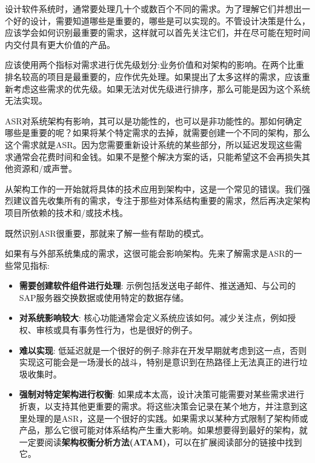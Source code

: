 
设计软件系统时，通常要处理几十个或数百个不同的需求。为了理解它们并想出一个好的设计，需要知道哪些是重要的，哪些是可以实现的。不管设计决策是什么，应该学会如何识别最重要的需求，这样就可以首先关注它们，并在尽可能在短时间内交付具有更大价值的产品。

\begin{tcolorbox}[colback=webgreen!5!white,colframe=webgreen!75!black, title=TIP]
\hspace*{0.7cm}应该使用两个指标对需求进行优先级划分:业务价值和对架构的影响。在两个比重排名较高的项目是最重要的，应作优先处理。如果提出了太多这样的需求，应该重新考虑这些需求的优先级。如果无法对优先级进行排序，那么可能是因为这个系统无法实现。
\end{tcolorbox}

ASR对系统架构有影响，其可以是功能性的，也可以是非功能性的。那如何确定哪些是重要的呢？如果将某个特定需求的去掉，就需要创建一个不同的架构，那么这个需求就是ASR。因为您需要重新设计系统的某些部分，所以延迟发现这些需求通常会花费时间和金钱。如果不是整个解决方案的话，只能希望这不会再损失其他资源和/或声誉。

\begin{tcolorbox}[colback=webgreen!5!white,colframe=webgreen!75!black, title=TIP]
\hspace*{0.7cm}从架构工作的一开始就将具体的技术应用到架构中，这是一个常见的错误。我们强烈建议首先收集所有的需求，专注于那些对体系结构重要的需求，然后再决定架构项目所依赖的技术和/或技术栈。
\end{tcolorbox}

既然识别ASR很重要，那就来了解一些有帮助的模式。


如果有与外部系统集成的需求，这很可能会影响架构。先来了解需求是ASR的一些常见指标:

\begin{itemize}
\item 
\textbf{需要创建软件组件进行处理}: 示例包括发送电子邮件、推送通知、与公司的SAP服务器交换数据或使用特定的数据存储。

\item 
\textbf{对系统影响较大}: 核心功能通常会定义系统应该如何。减少关注点，例如授权、审核或具有事务性行为，也是很好的例子。

\item 
\textbf{难以实现}: 低延迟就是一个很好的例子:除非在开发早期就考虑到这一点，否则实现这可能会是一场漫长的战斗，特别是意识到在热路径上无法真正的进行垃圾收集时。

\item 
\textbf{强制对特定架构进行权衡}: 如果成本太高，设计决策可能需要对某些需求进行折衷，以支持其他更重要的需求。将这些决策会记录在某个地方，并注意到这里处理的是ASR，这是一个很好的实践。如果需求以某种方式限制了架构师或产品，那么它很可能对体系结构产生重大影响。如果想要得到最好的架构，就一定要阅读\textbf{架构权衡分析方法(ATAM)}，可以在扩展阅读部分的链接中找到它。
\end{itemize}

